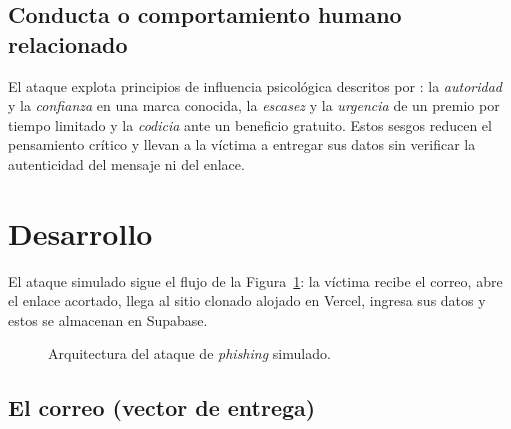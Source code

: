 \documentclass[12pt,a4paper]{article}
\begin{document}
\subsection{Conducta o comportamiento humano relacionado}

El ataque explota principios de influencia psicológica descritos por \citet{cialdini2001}: la \textit{autoridad} y la \textit{confianza} en una marca conocida, la \textit{escasez} y la \textit{urgencia} de un premio por tiempo limitado y la \textit{codicia} ante un beneficio gratuito. Estos sesgos reducen el pensamiento crítico y llevan a la víctima a entregar sus datos sin verificar la autenticidad del mensaje ni del enlace.

\section{Desarrollo}

El ataque simulado sigue el flujo de la Figura~\ref{fig:arquitectura}: la víctima recibe el correo, abre el enlace acortado, llega al sitio clonado alojado en Vercel, ingresa sus datos y estos se almacenan en Supabase.

\begin{figure}[H]
\centering
{}
\caption{Arquitectura del ataque de \textit{phishing} simulado.}
\label{fig:arquitectura}
\end{figure}

\subsection{El correo (vector de entrega)}
\end{document}
